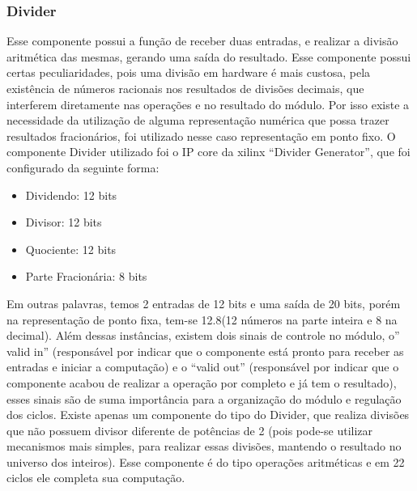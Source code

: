 \subsubsection{Divider}
Esse componente possui a função de receber duas entradas, e realizar a divisão aritmética das mesmas, gerando uma saída do resultado. Esse componente possui certas peculiaridades, pois uma divisão em hardware é mais custosa, pela existência de números racionais nos resultados de divisões decimais, que interferem diretamente nas operações e no resultado do módulo. Por isso existe a necessidade da utilização de alguma representação numérica que possa trazer resultados fracionários, foi utilizado nesse caso representação em ponto fixo. O componente Divider utilizado foi o IP core da xilinx “Divider Generator”, que foi configurado da seguinte forma: 
\begin{itemize}
\item 	Dividendo: 12 bits
\item 	Divisor: 12 bits
\item 	Quociente: 12 bits
\item 	Parte Fracionária: 8 bits
\end{itemize}
Em outras palavras, temos 2 entradas de 12 bits e uma saída de 20 bits, porém na representação de ponto fixa, tem-se 12.8(12 números na parte inteira e 8 na decimal). Além dessas instâncias, existem dois sinais de controle no módulo, o” valid in” (responsável por indicar que o componente está pronto para receber as entradas e iniciar a computação) e o “valid out” (responsável por indicar que o componente acabou de realizar a operação por completo e já tem o resultado), esses sinais são de suma importância para a organização do módulo e regulação dos ciclos. Existe apenas um componente do tipo do Divider, que realiza divisões que não possuem divisor diferente de potências de 2 (pois pode-se utilizar mecanismos mais simples, para realizar essas divisões, mantendo o resultado no universo dos inteiros).  Esse componente é do tipo operações aritméticas e em 22 ciclos ele completa sua computação.
